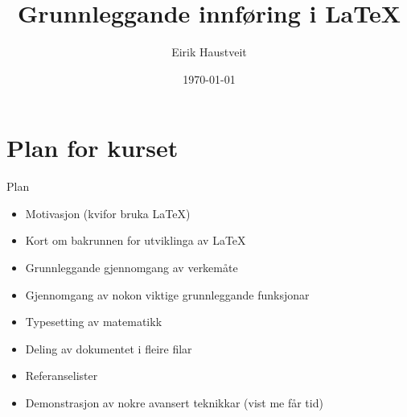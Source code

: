 \documentclass[10pt,a4paper]{beamer}
\title{Grunnleggande innføring i \LaTeX}
\date{\today}
\author{Eirik Haustveit}
\institute{Institutt for datateknologi, elektroteknologi og realfag}
\begin{document}
	
	\titlepage

	\section{Plan for kurset}

	\begin{frame}{Plan}
		
          \begin{itemize}
                        \item Motivasjon (kvifor bruka \LaTeX{})
			\item Kort om bakrunnen for utviklinga av \LaTeX{}
			\item Grunnleggande gjennomgang av verkemåte
			\item Gjennomgang av nokon viktige grunnleggande funksjonar
			\item Typesetting av matematikk
			\item Deling av dokumentet i fleire filar
			\item Referanselister
			\item Demonstrasjon av nokre avansert teknikkar (vist me får tid)
		\end{itemize}
		
	\end{frame}


	
	
	
	
	

	
	
	
	
	
	
	

	

	


\end{document}
